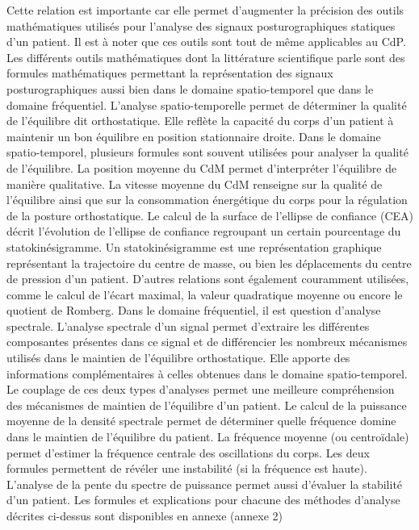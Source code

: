Cette relation est importante car elle permet d’augmenter la précision des outils mathématiques utilisés pour l’analyse des signaux posturographiques statiques d’un patient. Il est à noter que ces outils sont tout de même applicables au CdP.
Les différents outils mathématiques dont la littérature scientifique parle sont des formules mathématiques permettant la représentation des signaux posturographiques aussi bien dans le domaine spatio-temporel que dans le domaine fréquentiel. 
L’analyse spatio-temporelle permet de déterminer la qualité de l’équilibre dit orthostatique. Elle reflète la capacité du corps d’un patient à maintenir un bon équilibre en position stationnaire droite. Dans le domaine spatio-temporel, plusieurs formules sont souvent utilisées pour analyser la qualité de l’équilibre. La position moyenne du CdM permet d’interpréter l’équilibre de manière qualitative. La vitesse moyenne du CdM renseigne sur la qualité de l’équilibre ainsi que sur la consommation énergétique du corps pour la régulation de la posture orthostatique. Le calcul de la surface de l’ellipse de confiance (CEA) décrit l’évolution de l’ellipse de confiance regroupant un certain pourcentage du statokinésigramme. Un statokinésigramme est une représentation graphique représentant la trajectoire du centre de masse, ou bien les déplacements du centre de pression d’un patient. D’autres relations sont également couramment utilisées, comme le calcul de l’écart maximal, la valeur quadratique moyenne ou encore le quotient de Romberg.
Dans le domaine fréquentiel, il est question d’analyse spectrale. L’analyse spectrale d’un signal permet d’extraire les différentes composantes présentes dans ce signal et de différencier les nombreux mécanismes utilisés dans le maintien de l’équilibre orthostatique. Elle apporte des informations complémentaires à celles obtenues dans le domaine spatio-temporel. Le couplage de ces deux types d’analyses permet une meilleure compréhension des mécanismes de maintien de l’équilibre d’un patient. Le calcul de la puissance moyenne de la densité spectrale permet de déterminer quelle fréquence domine dans le maintien de l’équilibre du patient. La fréquence moyenne (ou centroïdale) permet d’estimer la fréquence centrale des oscillations du corps. Les deux formules permettent de révéler une instabilité (si la fréquence est haute). L’analyse de la pente du spectre de puissance permet aussi d’évaluer la stabilité d’un patient.
Les formules et explications pour chacune des méthodes d’analyse décrites ci-dessus sont disponibles en annexe (annexe 2)

